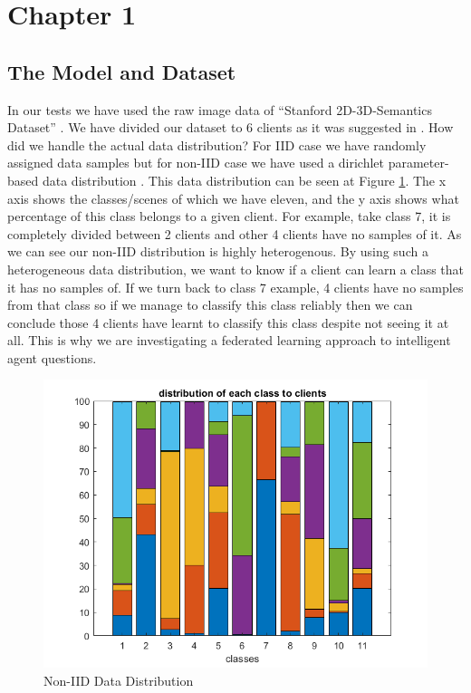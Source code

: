 \documentclass[11pt]{article}
\begin{document}
\section{Chapter 1}

\subsection{The Model and Dataset}

\par In our tests we have used the raw image data of “Stanford 2D-3D-Semantics Dataset” \cite{stanfordDataset}.  We have divided our dataset to 6 clients as it was suggested in \cite{stanfordDataset}. How did we handle the actual data distribution? For IID case we have randomly assigned data samples but for non-IID case we have used a dirichlet parameter-based data distribution \cite{dirichlet}. This data distribution can be seen at Figure \ref{fig:distSmall}. The x axis shows the classes/scenes of which we have eleven, and the y axis shows what percentage of this class belongs to a given client. For example, take class 7, it is completely divided between 2 clients and other 4 clients have no samples of it. As we can see our non-IID distribution is highly heterogenous. By using such a heterogeneous data distribution, we want to know if a client can learn a class that it has no samples of. If we turn back to class 7 example, 4 clients have no samples from that class so if we manage to classify this class reliably then we can conclude those 4 clients have learnt to classify this class despite not seeing it at all. This is why we are investigating a federated learning approach to intelligent agent questions.

\begin{figure}[h!]
\centering
  \includegraphics[scale=0.5]{distSmall}
  \caption{Non-IID Data Distribution}
  \label{fig:distSmall}
\end{figure}
\end{document}
